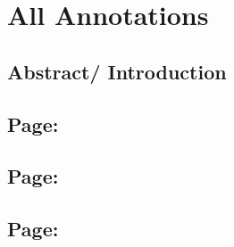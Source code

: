 
\section{All Annotations}

\subsection*{Abstract/ Introduction}


\subsection*{Page: }


\subsection*{Page: }


\subsection*{Page: } 


